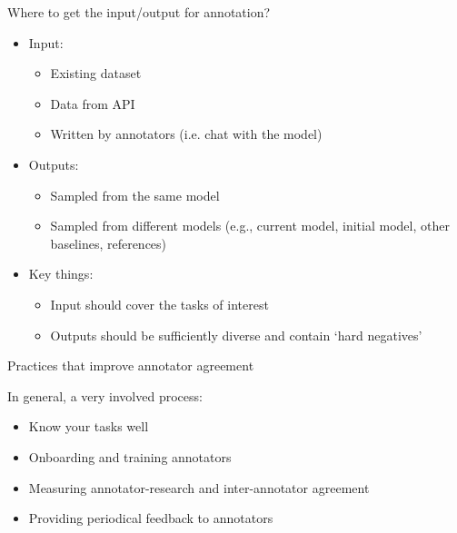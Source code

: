 \documentclass[usenames,dvipsnames,notes,11pt,aspectratio=169,hyperref={colorlinks=true, linkcolor=blue}]{beamer}
\begin{document}
\begin{frame}
    {Where to get the input/output for annotation?}
    \begin{itemize}
        \itemsep1em
        \item Input:
            \begin{itemize}
                \item Existing dataset
                \item Data from API
                \item Written by annotators (i.e. chat with the model)
            \end{itemize}
        \pause
        \item Outputs:
            \begin{itemize}
                \item Sampled from the same model
                \item Sampled from different models (e.g., current model, initial model, other baselines, references)
            \end{itemize}
        \pause
        \item Key things:
            \begin{itemize}
        \item Input should cover the tasks of interest
        \item Outputs should be sufficiently diverse and contain `hard negatives'
            \end{itemize}
    \end{itemize}
\end{frame}

\begin{frame}
    {Practices that improve annotator agreement}

    In general, a very involved process:
    \begin{itemize}
        \itemsep1em
        \item Know your tasks well
        \item Onboarding and training annotators
        \item Measuring annotator-research and inter-annotator agreement
        \item Providing periodical feedback to annotators
    \end{itemize}
\end{frame}
\end{document}

